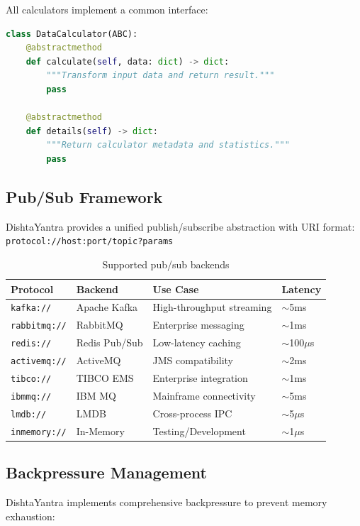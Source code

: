 \documentclass[11pt,a4paper]{article}
\begin{document}
All calculators implement a common interface:

\begin{lstlisting}[language=Python]
class DataCalculator(ABC):
    @abstractmethod
    def calculate(self, data: dict) -> dict:
        """Transform input data and return result."""
        pass
    
    @abstractmethod
    def details(self) -> dict:
        """Return calculator metadata and statistics."""
        pass
\end{lstlisting}

\subsection{Pub/Sub Framework}

DishtaYantra provides a unified publish/subscribe abstraction with URI format: \texttt{protocol://host:port/topic?params}

\begin{table}[H]
\centering
\caption{Supported pub/sub backends}
\begin{tabular}{@{}llll@{}}
\toprule
\textbf{Protocol} & \textbf{Backend} & \textbf{Use Case} & \textbf{Latency} \\
\midrule
\texttt{kafka://} & Apache Kafka & High-throughput streaming & $\sim$5ms \\
\texttt{rabbitmq://} & RabbitMQ & Enterprise messaging & $\sim$1ms \\
\texttt{redis://} & Redis Pub/Sub & Low-latency caching & $\sim$100$\mu$s \\
\texttt{activemq://} & ActiveMQ & JMS compatibility & $\sim$2ms \\
\texttt{tibco://} & TIBCO EMS & Enterprise integration & $\sim$1ms \\
\texttt{ibmmq://} & IBM MQ & Mainframe connectivity & $\sim$5ms \\
\texttt{lmdb://} & LMDB & Cross-process IPC & $\sim$5$\mu$s \\
\texttt{inmemory://} & In-Memory & Testing/Development & $\sim$1$\mu$s \\
\bottomrule
\end{tabular}
\end{table}

\subsection{Backpressure Management}

DishtaYantra implements comprehensive backpressure to prevent memory exhaustion:
\end{document}
